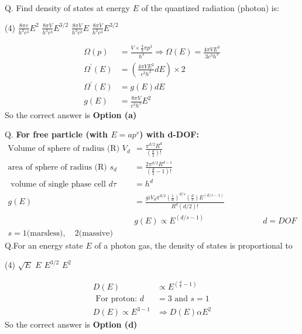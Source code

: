 Q. Find density of states at energy $E$ of the quantized radiation (photon) is:
 \begin{tasks}(4)
	\task[\textbf{a.}]$\frac{8 \pi v}{h^{3} c^{3}} E^{2}$
	\task[\textbf{b.}]$\frac{8 \pi V}{h^{3} c^{3}} E^{3 / 2}$
	\task[\textbf{c.}]$\frac{8 \pi V}{h^{3} c^{3}} E$
	\task[\textbf{d.}] $\frac{8 \pi V}{h^{3} c^{3}} E^{3 / 2}$
\end{tasks}
\begin{answer}
	\begin{align*}
	\Omega(p)&=\frac{V \times \frac{4}{3} \pi p^{3}}{h^{3}} \Rightarrow \Omega(E)=\frac{4 \pi V E^{3}}{3 c^{3} h^{3}}\\
	\Omega^{\prime}(E)&=\left(\frac{4 \pi V E^{2}}{c^{3} h^{3}} d E\right) \times 2\\
	\Omega^{\prime}(E)&=g(E) d E\\
	g(E)&=\frac{8 \pi V}{c^{3} h^{3}} E^{2}
	\end{align*}
	So the correct answer is \textbf{Option (a)}
\end{answer}
Q. \textbf{For free particle (with $E=ap^s$) with d-DOF: }\\
\begin{align*}
\text{Volume of sphere of radius (R) }V_{d}&=\frac{\pi^{d / 2} R^{d}}{\left(\frac{d}{2}\right) !}\\
\text{area of sphere of radius (R) }s_{d}&=\frac{2 \pi^{d / 2} R^{d-1}}{\left(\frac{d}{2}-1\right) !}\\
\text{ volume of single phase cell }d \tau&=h^{d}\\
g(E)&=\frac{g i V_{d} \pi^{d / 2}\left(\frac{1}{a}\right)^{d / s}\left(\frac{d}{s}\right) E^{(d / s-1)}}{R^{d}(d / 2) !}\\
&g(E) \propto E^{(d / s-1)}\hspace{3cm}d=DOF\\
s=1 \text{(marsless)},\quad
2 \text{(massive)}
\end{align*}
Q.For an energy state $E$ of a photon gas, the density of states is proportional to 
 \begin{tasks}(4)
	\task[\textbf{a.}] $\sqrt{E}$
	\task[\textbf{b.}] $E $
	\task[\textbf{c.}]$E^{3 / 2}$
	\task[\textbf{d.}] $E^{2}$
\end{tasks}
\begin{answer}
	\begin{align*}
	D(E) &\propto E^{\left(\frac{d}{s}-1\right)}\\
	\text { For proton: } d&=3 \text { and } s=1\\
	D(E) \propto E^{3-1} &\Rightarrow D(E) \alpha E^{2}
	\end{align*}
		So the correct answer is \textbf{Option (d)}
\end{answer}
